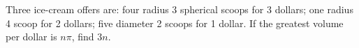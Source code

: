 Three ice-cream offers are: four radius 3 spherical scoops for 3 dollars; one radius 4 scoop for 2 dollars; five diameter 2 scoops for 1 dollar. If the greatest volume per dollar is $n\pi$, find $3n$.
